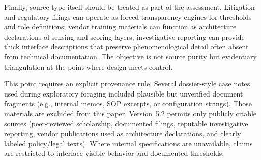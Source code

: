 \documentclass[runningheads]{llncs}
\begin{document}
Finally, source type itself should be treated as part of the assessment. Litigation and regulatory filings can operate as forced transparency engines for thresholds and role definitions; vendor training materials can function as architecture declarations of sensing and scoring layers; investigative reporting can provide thick interface descriptions that preserve phenomenological detail often absent from technical documentation. The objective is not source purity but evidentiary triangulation at the point where design meets control.

This point requires an explicit provenance rule. Several dossier-style case notes used during exploratory foraging included plausible but unverified document fragments (e.g., internal memos, SOP excerpts, or configuration strings). Those materials are excluded from this paper. Version~5.2 permits only publicly citable sources (peer-reviewed scholarship, documented filings, reputable investigative reporting, vendor publications used as architecture declarations, and clearly labeled policy/legal texts). Where internal specifications are unavailable, claims are restricted to interface-visible behavior and documented thresholds.
\end{document}
